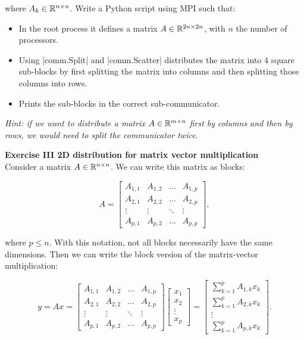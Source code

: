 \documentclass[11pt]{article}
\begin{document}
where $A_{k} \in \mathbb{R}^{n \times n}$. Write a Python script using MPI such that:

\begin{itemize}
   \item In the root process it defines a matrix $A \in \mathbb{R}^{2n \times 2n}$, with $n$ the number of processors. 
   \item Using |comm.Split| and |comm.Scatter| distributes the matrix into $4$ square sub-blocks by first splitting the matrix into columns and then splitting those columns into rows.
   \item Prints the sub-blocks in the correct sub-communicator.
\end{itemize}

\textit{Hint: if we want to distribute a matrix} $A \in \mathbb{R}^{m \times n}$ \textit{first by columns and then by rows, we would need to split the communicator twice}.

\bigskip

{\bf{Exercise III 2D distribution for matrix vector multiplication}}\\

Consider a matrix $A \in \mathbb{R}^{n \times n}$. We can write this matrix as blocks:

\[ A = \begin{bmatrix} A_{1,1} & A_{1, 2} & \hdots & A_{1,p} \\  A_{2,1} & A_{2, 2} & \hdots & A_{2,p} \\ \vdots & \vdots & \ddots & \vdots \\ A_{p,1} & A_{p, 2} & \hdots & A_{p,p}    \end{bmatrix} , \]

where $p \leq n$. With this notation, not all blocks necessarily have the same dimensions. Then we can write the block version of the matrix-vector multiplication:

\[ y = Ax =  \begin{bmatrix} A_{1,1} & A_{1, 2} & \hdots & A_{1,p} \\  A_{2,1} & A_{2, 2} & \hdots & A_{2,p} \\ \vdots & \vdots & \ddots & \vdots \\ A_{p,1} & A_{p, 2} & \hdots & A_{p,p}    \end{bmatrix} \begin{bmatrix} x_{1} \\ x_{2} \\ \vdots \\ x_{p}  \end{bmatrix} = \begin{bmatrix} \sum_{k = 1}^p A_{1, k} x_k \\  \sum_{k = 1}^p A_{2, k} x_k \\ \vdots \\ \sum_{k = 1}^p A_{p, k} x_k\end{bmatrix}  .  \]
\end{document}
